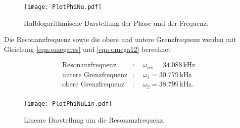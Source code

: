 \begin{figure}
  \centering
  \texttt{[image: PlotPhiNu.pdf]}
  \caption{Halblogarithmische Darstellung der Phase und der Frequenz.}
  \label{fig:phinu}
\end{figure}

Die Resonanzfrequenz sowie die obere und untere Grenzfrequenz werden mit Gleichung \eqref{eqn:omegares} und \eqref{eqn:omega12} berechnet

\begin{align*}
  \text{Resonanzfrequenz}&:\quad \omega_\text{res} = 34.088\, \si{\kilo\hertz} \\
  \text{untere Grenzfrequenz}&:\quad \omega_\text{1} = 30.779\, \si{\kilo\hertz} \\
  \text{obere Grenzfrequenz}&:\quad \omega_\text{2} = 38.799\, \si{\kilo\hertz}. \\
\end{align*}

\begin{figure}
  \centering
  \texttt{[image: PlotPhiNuLin.pdf]}
  \caption{Lineare Darstellung um die Resonanzfrequenz.}
  \label{fig:phinulin}
\end{figure}
